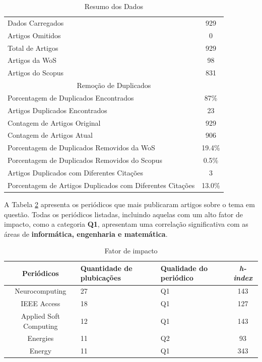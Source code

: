 \begin{table}[H]
	\centering
	\caption{Resumo dos Dados}
	\label{tab:resumo}
	\begin{tabular}{lc}
		\hline
		Dados Carregados & 929 \\
		Artigos Omitidos & 0 \\
		Total de Artigos & 929 \\
		Artigos da WoS & 98 \\
		Artigos do Scopus & 831 \\
		\hline
		\multicolumn{2}{c}{Remoção de Duplicados} \\
		\hline
		Porcentagem de Duplicados Encontrados & 87\% \\
		Artigos Duplicados Encontrados & 23 \\
		Contagem de Artigos Original & 929 \\
		Contagem de Artigos Atual & 906 \\
		Porcentagem de Duplicados Removidos da WoS & 19.4\% \\
		Porcentagem de Duplicados Removidos do Scopus & 0.5\% \\
		Artigos Duplicados com Diferentes Citações & 3 \\
		Porcentagem de Artigos Duplicados com Diferentes Citações & 13.0\% \\
		\hline
	\end{tabular}
	
\end{table}


A Tabela \ref{tb2} apresenta os periódicos que mais publicaram artigos sobre o tema em questão. Todas os periódicos listadas, incluindo aquelas com um alto fator de impacto, como a categoria \textbf{Q1}, apresentam uma correlação significativa com as áreas de \textbf{informática, engenharia e matemática}.

\begin{table}[H]
	\centering
	\caption{Fator de impacto}\label{tb2}
	\begin{tabular}{@{}cp{3cm}p{3cm}c@{}}
		\toprule
		Periódicos      & Quantidade de plubicações & Qualidade do periódico & \textit{h-index} \\\midrule
		Neurocomputing         & 27                         & Q1                     & 143     \\
		IEEE Access            & 18                         & Q1                     & 127     \\
		Applied Soft Computing & 12                         & Q1                     & 143     \\
		Energies               & 11                         & Q2                     & 93      \\
		Energy                 & 11                         & Q1                     & 343     \\ \bottomrule
	\end{tabular}
	
	
\end{table}


